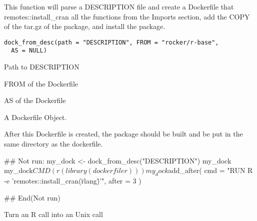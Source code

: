 \documentclass[a4paper]{book}
\begin{document}
%
\begin{Examples}
\end{Examples}
%
\begin{Description}\relax
This function will parse a DESCRIPTION file and
create a Dockerfile that remotes::install\_cran
all the functions from the Imports section, add
the COPY of the tar.gz of the package, and install
the package.
\end{Description}
%
\begin{Usage}
\begin{verbatim}
dock_from_desc(path = "DESCRIPTION", FROM = "rocker/r-base",
  AS = NULL)
\end{verbatim}
\end{Usage}
%
\begin{Arguments}
\begin{ldescription}
\item[\code{path}] Path to DESCRIPTION

\item[\code{FROM}] FROM of the Dockerfile

\item[\code{AS}] AS of the Dockerfile
\end{ldescription}
\end{Arguments}
%
\begin{Value}
A Dockerfile Object.
\end{Value}
%
\begin{Note}\relax
After this Dockerfile is created, the package
should be built and be put in the same directory
as the dockerfile.
\end{Note}
%
\begin{Examples}
\begin{ExampleCode}
## Not run: 
my_dock <- dock_from_desc("DESCRIPTION")
my_dock
my_dock$CMD(r(library(dockerfiler)))
my_dock$add_after(
cmd = "RUN R -e 'remotes::install_cran(\"rlang\")'",
after = 3
)

## End(Not run)
\end{ExampleCode}
\end{Examples}
%
\begin{Description}\relax
Turn an R call into an Unix call
\end{Description}
\end{document}
